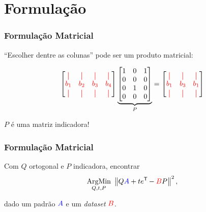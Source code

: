 \section{Formulação}

\begin{frame}[fragile]
  \frametitle{Formulação Matricial}
  \begin{center}
    ``Escolher dentre as colunas'' pode ser um produto matricial:

    \[
      \begin{bmatrix}
        \red{\vert} & \red{\vert} & \red{\vert} & \red{\vert} \\
        \red{b_1} & \red{b_2} & \red{b_3} & \red{b_4} \\
        \red{\vert} & \red{\vert} & \red{\vert} & \red{\vert}
      \end{bmatrix}
      \underbrace{\begin{bmatrix}
        1 & 0 & 1 \\
        0 & 0 & 0 \\
        0 & 1 & 0 \\
        0 & 0 & 0
      \end{bmatrix}}_{P}
      =
      \begin{bmatrix}
        \red{\vert} & \red{\vert} & \red{\vert} \\
        \red{b_1} & \red{b_3} & \red{b_1} \\
        \red{\vert} & \red{\vert} & \red{\vert}
      \end{bmatrix}
    \]

    $P$ é uma matriz indicadora!
  \end{center}
\end{frame}

\begin{frame}
  \frametitle{Formulação Matricial}
  \begin{center}
    Com $Q$ ortogonal e $P$ indicadora, encontrar
    \[\underset{Q,t,P}{\text{ArgMin}}\,\, \left\lVert Q\textcolor{blue}{A} + t e^{\mathsf{T}\mkern-1mu} - \textcolor{red}{B}P\right\rVert^2,\]

    dado um padrão $\textcolor{blue}{A}$ e um \textit{dataset} $\textcolor{red}{B}$.
  \end{center}
\end{frame}
